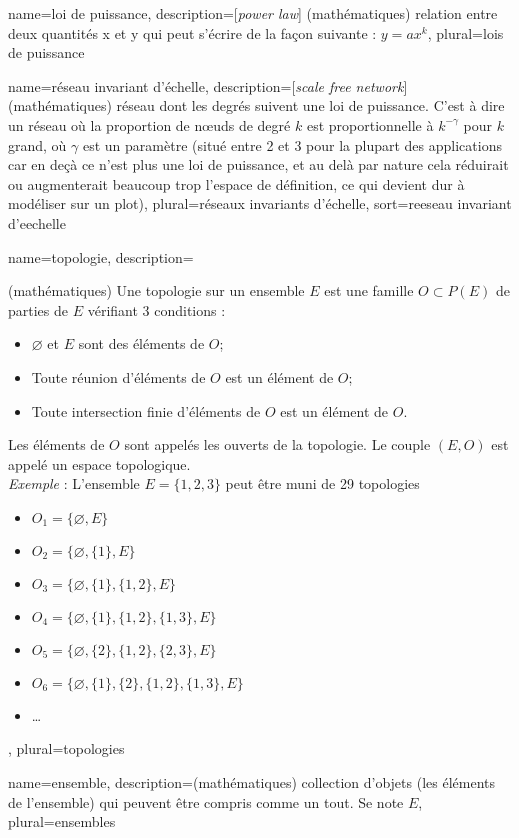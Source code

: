 {
	name={loi de puissance},
	description={[\textit{power law}] (mathématiques) relation entre deux quantités x et y qui peut s'écrire de la façon suivante : \(y=ax^{k}\)}, 
	plural={lois de puissance}
}

{
	name={r\'eseau invariant d'échelle},
	description={[\textit{scale free network}] (mathématiques) réseau dont les degrés suivent une loi de puissance. C'est à dire un réseau où la proportion de nœuds de degré $k$ est proportionnelle à $k^{-\gamma}$ pour $k$ grand, où $\gamma$ est un paramètre (situé entre 2 et 3 pour la plupart des applications car en deçà ce n'est plus une loi de puissance, et au delà par nature cela réduirait ou augmenterait beaucoup trop l'espace de définition, ce qui devient dur à modéliser sur un plot)}, 
	plural={r\'eseaux invariants d'échelle},
	sort={reeseau invariant d'eechelle}
}

{
	name={topologie},
	description={(mathématiques) Une topologie sur un ensemble $E$ est une famille $O \subset P(E)$ de parties de $E$ vérifiant 3 conditions : 
	\begin{itemize}
		\item $\varnothing$ et $E$ sont des éléments de $O$;
		\item Toute réunion d'éléments de $O$ est un élément de $O$;
		\item Toute intersection finie d'éléments de $O$ est un élément de $O$.
	\end{itemize}
	Les éléments de $O$ sont appelés les ouverts de la topologie. Le couple $(E, O)$ est appelé un espace topologique.\\\emph{Exemple} : L'ensemble $E=\{1,2,3\}$ peut être muni de 29 topologies
	\begin{itemize}
		\item $O_1 = \{\varnothing, E\}$
		\item $O_2 = \{\varnothing, \{1\}, E\}$
		\item $O_3 = \{\varnothing, \{1\}, \{1,2\}, E\}$
		\item $O_4 = \{\varnothing, \{1\}, \{1,2\}, \{1,3\}, E\}$
		\item $O_5 = \{\varnothing, \{2\}, \{1,2\}, \{2,3\}, E\}$
		\item $O_6 = \{\varnothing, \{1\}, \{2\}, \{1,2\}, \{1,3\}, E\}$
		\item \dots
	\end{itemize}},
	plural={topologies}
}

{
	name={ensemble},
	description={(mathématiques) collection d’objets (les éléments de l'ensemble) qui peuvent être compris comme un tout. Se note $E$}, 
	plural={ensembles}
}

